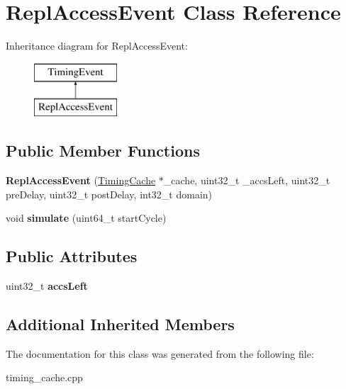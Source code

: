\hypertarget{classReplAccessEvent}{\section{Repl\-Access\-Event Class Reference}
\label{classReplAccessEvent}
}
Inheritance diagram for Repl\-Access\-Event\-:\begin{figure}[H]
\begin{center}
\leavevmode
\includegraphics[height=2.000000cm]{classReplAccessEvent}
\end{center}
\end{figure}
\subsection*{Public Member Functions}
\begin{DoxyCompactItemize}
\item 
\hypertarget{classReplAccessEvent_a5a321766248c6573494a2063a112e890}{{\bfseries Repl\-Access\-Event} (\hyperlink{classTimingCache}{Timing\-Cache} $\ast$\-\_\-cache, uint32\-\_\-t \-\_\-accs\-Left, uint32\-\_\-t pre\-Delay, uint32\-\_\-t post\-Delay, int32\-\_\-t domain)}\label{classReplAccessEvent_a5a321766248c6573494a2063a112e890}

\item 
\hypertarget{classReplAccessEvent_ac43826b5f3c369ff3e8853aa2e789b37}{void {\bfseries simulate} (uint64\-\_\-t start\-Cycle)}\label{classReplAccessEvent_ac43826b5f3c369ff3e8853aa2e789b37}

\end{DoxyCompactItemize}
\subsection*{Public Attributes}
\begin{DoxyCompactItemize}
\item 
\hypertarget{classReplAccessEvent_aa8eb9a7207400d43644f3fef71bf2473}{uint32\-\_\-t {\bfseries accs\-Left}}\label{classReplAccessEvent_aa8eb9a7207400d43644f3fef71bf2473}

\end{DoxyCompactItemize}
\subsection*{Additional Inherited Members}


The documentation for this class was generated from the following file\-:\begin{DoxyCompactItemize}
\item 
timing\-\_\-cache.\-cpp\end{DoxyCompactItemize}
